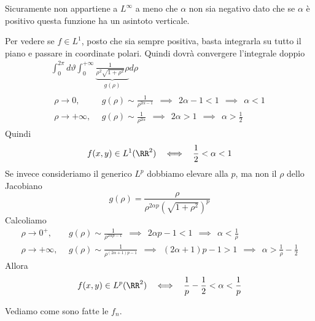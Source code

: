 \ParteSoluzioni

\Soluzione

Sicuramente non appartiene a $L^{\infty}$ a meno che $\alpha $ non sia negativo dato che se $\alpha $ è positivo questa funzione ha un asintoto verticale.

Per vedere se $f\in L^{1}$, posto che sia sempre positiva, basta integrarla su tutto il piano e passare in coordinate polari. Quindi dovrà convergere l'integrale doppio
\begin{gather*}
\int^{2\pi}_{0} d\vartheta \int^{+ \infty}_{0}\underbrace{\frac{1}{\rho^{2}\sqrt{1 + \rho^{2}}} \rho}_{g(\rho)} d\rho \\
\begin{aligned}
\rho \rightarrow 0, & \ \ g(\rho)\sim \frac{1}{\rho^{2\alpha - 1}} \ \ \implies \ \ 2\alpha - 1 < 1\ \ \implies \ \ \alpha < 1\\
\rho \rightarrow + \infty, & \ \ g(\rho)\sim \frac{1}{\rho^{2\alpha}} \ \ \implies \ \ 2\alpha > 1\ \ \implies \ \ \alpha > \frac{1}{2}
\end{aligned}
\end{gather*}
Quindi
\begin{equation*}
f(x, y)\in L^{1} (\RR^{2})\ \ \iff \ \ \frac{1}{2} < \alpha < 1
\end{equation*}
Se invece consideriamo il generico $L^{p}$ dobbiamo elevare alla $p$, ma non il $\rho $ dello Jacobiano
\begin{equation*}
g(\rho) = \frac{\rho}{\rho^{2\alpha p}\left(\sqrt{1 + \rho^{2}}\right)^{p}}
\end{equation*}
Calcoliamo
\begin{equation*}
\begin{aligned}
\rho \rightarrow 0^{+}, & \ \ g(\rho)\sim \frac{1}{\rho^{2\alpha p - 1}} \ \ \implies \ \ 2\alpha p - 1 < 1\ \ \implies \ \ \alpha < \frac{1}{\rho}\\
\rho \rightarrow + \infty, & \ \ g(\rho)\sim \frac{1}{\rho^{(2\alpha + 1)p - 1}} \ \ \implies \ \ (2\alpha + 1)p - 1 > 1\ \ \implies \ \ \alpha > \frac{1}{\rho} - \frac{1}{2}
\end{aligned}
\end{equation*}
Allora
\begin{equation*}
f(x, y)\in L^{p} (\RR^{2})\ \ \iff \ \ \frac{1}{p} - \frac{1}{2} < \alpha < \frac{1}{p}
\end{equation*}

\Soluzione

Vediamo come sono fatte le $f_{n}$.


